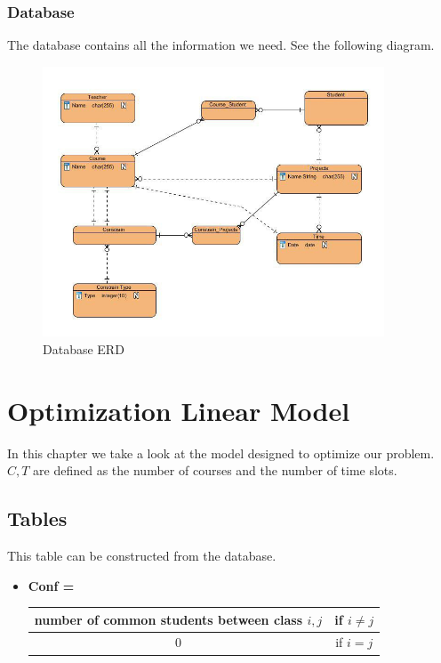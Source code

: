 \documentclass{report}
\begin{document}
\subsection{Database}
The database contains all the information we need. See the following diagram.


	\begin{figure}
		\center
			\includegraphics[width=4in]{db.jpg}
			\caption{Database ERD}
	\end{figure}

	

\chapter{Optimization Linear Model} 
In this chapter we take a look at the model designed to optimize our problem. $C, T$ are defined as the number of courses and the number of time slots.

\section{Tables}
This table can be constructed from the database.
\begin{itemize}
\item
{\textbf{Conf \big[ C \big]\big[ C \big]  \space =} \begin{tabular}{| c | c |} \hline
number of common students between class $i, j$ & if $i \neq j$ \\ \hline
0 & if $i = j$ \\ \hline
\end{tabular}}
\end{itemize}
\end{document}
